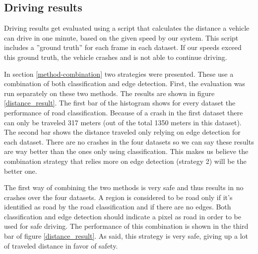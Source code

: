 \documentclass[runningheads,a4paper]{llncs}
\begin{document}
\subsection{Driving results}
Driving results get evaluated using a script that calculates the distance a vehicle can drive in one minute, based on the given speed by our system. This script includes a ''ground truth'' for each frame in each dataset. If our speeds exceed this ground truth, the vehicle crashes and is not able to continue driving.

In section \ref{method-combination} two strategies were presented. These use a combination of both classification and edge detection. First, the evaluation was run separately on these two methods. The results are shown in figure \ref{distance_result}. The first bar of the histogram shows for every dataset the performance of road classification. Because of a crash in the first dataset there can only be traveled 317 meters (out of the total 1350 meters in this dataset). The second bar shows the distance traveled only relying on edge detection for each dataset. There are no crashes in the four datasets so we can say these results are way better than the ones only using classification. This makes us believe the combination strategy that relies more on edge detection (strategy 2) will be the better one.

The first way of combining the two methods is very safe and thus results in no crashes over the four datasets. A region is considered to be road only if it's identified as road by the road classification and if there are no edges. Both classification and edge detection should indicate a pixel as road in order to be used for safe driving. The performance of this combination is shown in the third bar of figure \ref{distance_result}. As said, this strategy is very safe, giving up a lot of traveled distance in favor of safety. 
\end{document}
